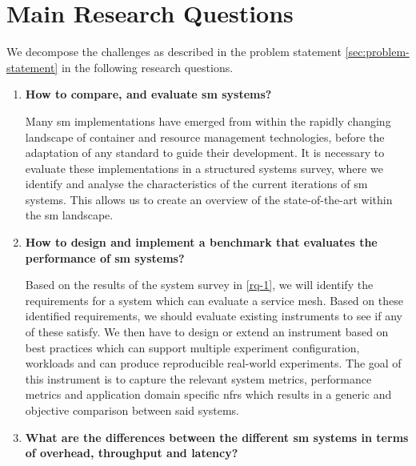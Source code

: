\section{Main Research Questions}
\label{sec:introduction:research-questions}

We decompose the challenges as described in the problem statement \cref{sec:problem-statement} in the following research questions.




\begin{enumerate}[label=\textbf{RQ\arabic*}, leftmargin=3\parindent]
    \item \textbf{How to compare, and evaluate \gls{sm} systems?}
    \label{rq-1}
    
    Many \gls{sm} implementations have emerged from within the rapidly changing landscape of container and resource management technologies, before the adaptation of any standard to guide their development. It is necessary to evaluate these implementations in a structured systems survey, where we identify and analyse the characteristics of the current iterations of \gls{sm} systems. This allows us to create an overview of the state-of-the-art within the \gls{sm} landscape.
    
    \item \textbf{How to design and implement a benchmark that evaluates the performance of \gls{sm} systems?}
    \label{rq-2}
    
    Based on the results of the system survey in \ref{rq-1}, we will identify the requirements for a system which can evaluate a service mesh. Based on these identified requirements, we should evaluate existing instruments to see if any of these satisfy. We then have to design or extend an instrument based on best practices \cite{folkerts2012benchmarking} which can support multiple experiment configuration, workloads and can produce reproducible real-world experiments. The goal of this instrument is to capture the relevant system metrics, performance metrics and application domain specific \glspl{nfr} which results in a generic and objective comparison between said systems.

    \item \textbf{What are the differences between the different \gls{sm} systems in terms of overhead, throughput and latency?}
    \label{rq-3}
    

\end{enumerate}
